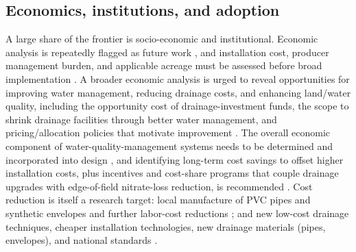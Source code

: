 \documentclass[11pt]{article}
\begin{document}
\subsection{Economics, institutions, and adoption}
A large share of the frontier is socio-economic and institutional. Economic analysis is repeatedly flagged as future work \parencite{Kladivko2005,Saadat2017,Manik2019}, and installation cost, producer management burden, and applicable acreage must be assessed before broad implementation \parencite{Helmers2012}. A broader economic analysis is urged to reveal opportunities for improving water management, reducing drainage costs, and enhancing land/water quality, including the opportunity cost of drainage-investment funds, the scope to shrink drainage facilities through better water management, and pricing/allocation policies that motivate improvement \parencite{Wichelns2002}. The overall economic component of water-quality-management systems needs to be determined and incorporated into design \parencite{THOMAS1995}, and identifying long-term cost savings to offset higher installation costs, plus incentives and cost-share programs that couple drainage upgrades with edge-of-field nitrate-loss reduction, is recommended \parencite{Castellano2019}. Cost reduction is itself a research target: local manufacture of PVC pipes and synthetic envelopes and further labor-cost reductions \parencite{Datta2002}; and new low-cost drainage techniques, cheaper installation technologies, new drainage materials (pipes, envelopes), and national standards \parencite{Yannopoulos2020}.
\end{document}
